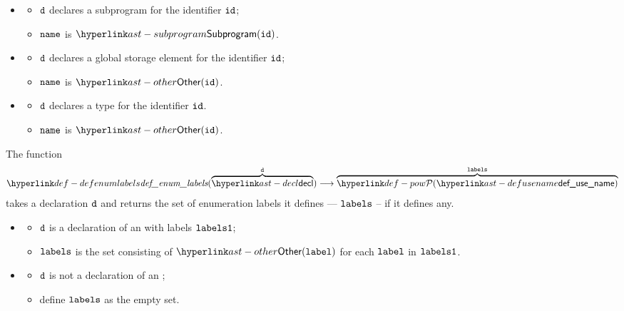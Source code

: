 \ProseParagraph
\OneApplies
\begin{itemize}
  \item {}
  \begin{itemize}
    \item $\texttt{d}$ declares a subprogram for the identifier $\texttt{id}$;
    \item $\texttt{name}$ is $\Subprogram(\id)$.
  \end{itemize}

  \item {}
  \begin{itemize}
    \item $\texttt{d}$ declares a global storage element for the identifier $\texttt{id}$;
    \item $\texttt{name}$ is $\Other(\id)$.
  \end{itemize}

  \item {}
  \begin{itemize}
    \item $\texttt{d}$ declares a type for the identifier $\texttt{id}$.
    \item $\texttt{name}$ is $\Other(\id)$.
  \end{itemize}
\end{itemize}

\FormallyParagraph
{}

\hypertarget{def-defenumlabels}{}
The function
\[
\defenumlabels(\overname{\decl}{\vd}) \aslto \overname{\pow{\defusename}}{\vlabels}
\]
takes a declaration $\texttt{d}$ and returns the set of enumeration labels it defines --- $\texttt{labels}$ --
if it defines any.

\ProseParagraph
\OneApplies
\begin{itemize}
  \item {}
  \begin{itemize}
    \item $\texttt{d}$ is a declaration of an \enumerationtypeterm{} with labels $\texttt{labels1}$;
    \item $\texttt{labels}$ is the set consisting of $\Other(\vlabel)$ for each $\texttt{label}$ in $\texttt{labels1}$.
  \end{itemize}

  \item {}
  \begin{itemize}
    \item $\texttt{d}$ is not a declaration of an \enumerationtypeterm{};
    \item define $\texttt{labels}$ as the empty set.
  \end{itemize}
\end{itemize}

